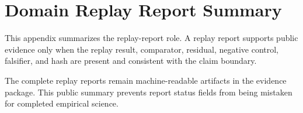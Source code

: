 \section{Domain Replay Report Summary}

\label{sec:oc-core-1-3-domain-replay-report-summary}

This appendix summarizes the replay-report role. A replay report supports public evidence only when the replay result, comparator, residual, negative control, falsifier, and hash are present and consistent with the claim boundary.


The complete replay reports remain machine-readable artifacts in the evidence package. This public summary prevents report status fields from being mistaken for completed empirical science.

